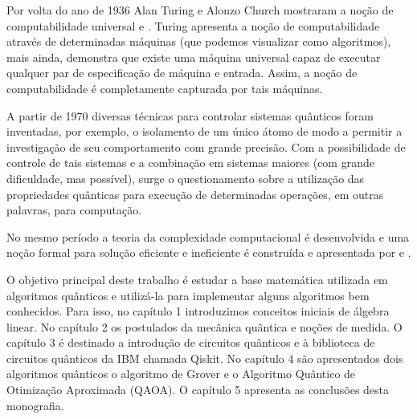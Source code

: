 	Por volta do ano de 1936 Alan Turing e Alonzo Church mostraram a noção de computabilidade universal \cite{turing1936computable} e \cite{church1936unsolvable}. Turing apresenta a noção de computabilidade através de determinadas máquinas (que podemos visualizar como algoritmos), mais ainda, demonstra que existe uma máquina universal capaz de executar qualquer par de especificação de máquina e entrada. Assim, a noção de computabilidade é completamente capturada por tais máquinas.

	A partir de 1970 diversas técnicas para controlar sistemas quânticos foram inventadas, por exemplo, o isolamento de um único átomo de modo a permitir a investigação de seu comportamento com grande precisão. Com a possibilidade de controle de tais sistemas e a combinação em sistemas maiores (com grande dificuldade, mas possível), surge o questionamento sobre a utilização das propriedades quânticas para execução de determinadas operações, em outras palavras, para computação.

	No mesmo período a teoria da complexidade computacional é desenvolvida e uma noção formal para solução eficiente e ineficiente é construída e apresentada por \cite{Cook1971} e \cite{Levin1973}.

	O objetivo principal deste trabalho é estudar a base matemática utilizada em algoritmos quânticos e utilizá-la para implementar alguns algoritmos bem conhecidos. Para isso, no capítulo 1 introduzimos conceitos iniciais de álgebra linear. No capítulo 2 os postulados da mecânica quântica e noções de medida. O capítulo 3 é destinado a introdução de circuitos quânticos e à biblioteca de circuitos quânticos da IBM chamada Qiskit. No capítulo 4 são apresentados dois algoritmos quânticos o algoritmo de Grover e o Algoritmo Quântico de Otimização Aproximada (QAOA). O capítulo 5 apresenta as conclusões desta monografia.
